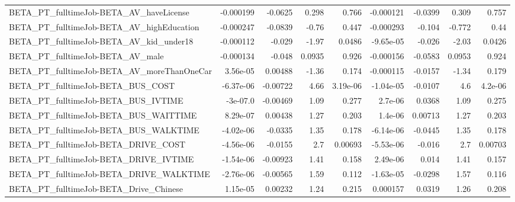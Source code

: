 \begin{tabular}{lrrrrrrrr}
BETA\_PT\_fulltimeJob-BETA\_AV\_haveLicense            &   -0.000199 &      -0.0625 &    0.298 &    0.766 &  -0.000121 &     -0.0399 &        0.309 &         0.757 \\
BETA\_PT\_fulltimeJob-BETA\_AV\_highEducation          &   -0.000247 &      -0.0839 &    -0.76 &    0.447 &  -0.000293 &      -0.104 &       -0.772 &          0.44 \\
BETA\_PT\_fulltimeJob-BETA\_AV\_kid\_under18            &   -0.000112 &       -0.029 &    -1.97 &   0.0486 &  -9.65e-05 &      -0.026 &        -2.03 &        0.0426 \\
BETA\_PT\_fulltimeJob-BETA\_AV\_male                   &   -0.000134 &       -0.048 &   0.0935 &    0.926 &  -0.000156 &     -0.0583 &       0.0953 &         0.924 \\
BETA\_PT\_fulltimeJob-BETA\_AV\_moreThanOneCar         &    3.56e-05 &      0.00488 &    -1.36 &    0.174 &  -0.000115 &     -0.0157 &        -1.34 &         0.179 \\
BETA\_PT\_fulltimeJob-BETA\_BUS\_COST                  &   -6.37e-06 &     -0.00722 &     4.66 & 3.19e-06 &  -1.04e-05 &     -0.0107 &          4.6 &       4.2e-06 \\
BETA\_PT\_fulltimeJob-BETA\_BUS\_IVTIME                &    -3e-07.0 &     -0.00469 &     1.09 &    0.277 &    2.7e-06 &      0.0368 &         1.09 &         0.275 \\
BETA\_PT\_fulltimeJob-BETA\_BUS\_WAITTIME              &    8.29e-07 &      0.00438 &     1.27 &    0.203 &    1.4e-06 &     0.00713 &         1.27 &         0.203 \\
BETA\_PT\_fulltimeJob-BETA\_BUS\_WALKTIME              &   -4.02e-06 &      -0.0335 &     1.35 &    0.178 &  -6.14e-06 &     -0.0445 &         1.35 &         0.178 \\
BETA\_PT\_fulltimeJob-BETA\_DRIVE\_COST                &   -4.56e-06 &      -0.0155 &      2.7 &  0.00693 &  -5.53e-06 &      -0.016 &          2.7 &       0.00703 \\
BETA\_PT\_fulltimeJob-BETA\_DRIVE\_IVTIME              &   -1.54e-06 &     -0.00923 &     1.41 &    0.158 &   2.49e-06 &       0.014 &         1.41 &         0.157 \\
BETA\_PT\_fulltimeJob-BETA\_DRIVE\_WALKTIME            &   -2.76e-06 &     -0.00565 &     1.59 &    0.112 &  -1.63e-05 &     -0.0298 &         1.57 &         0.116 \\
BETA\_PT\_fulltimeJob-BETA\_Drive\_Chinese             &    1.15e-05 &      0.00232 &     1.24 &    0.215 &   0.000157 &      0.0319 &         1.26 &         0.208 \\

\end{tabular}
